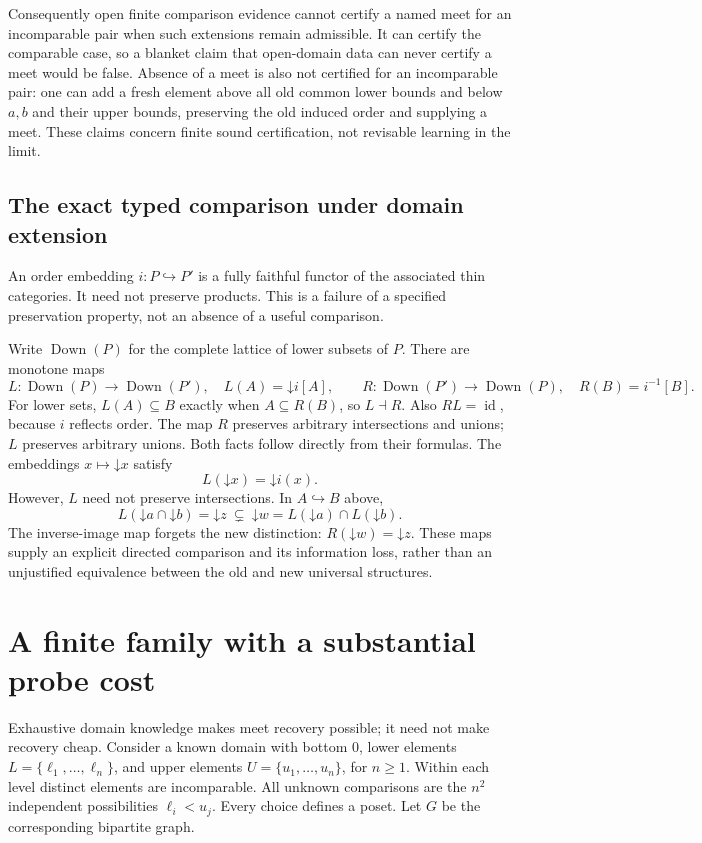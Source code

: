 \documentclass[11pt]{article}
\theoremstyle{remark}
\newcommand{\id}{\operatorname{id}}
\newcommand{\Down}{\operatorname{Down}}
\begin{document}
Consequently open finite comparison evidence cannot certify a named meet for an incomparable pair when such extensions remain admissible. It can certify the comparable case, so a blanket claim that open-domain data can never certify a meet would be false. Absence of a meet is also not certified for an incomparable pair: one can add a fresh element above all old common lower bounds and below $a,b$ and their upper bounds, preserving the old induced order and supplying a meet. These claims concern finite sound certification, not revisable learning in the limit.

\subsection{The exact typed comparison under domain extension}
\label{sec:downsets}

An order embedding $i:P\hookrightarrow P'$ is a fully faithful functor of the associated thin categories. It need not preserve products. This is a failure of a specified preservation property, not an absence of a useful comparison.

Write $\Down(P)$ for the complete lattice of lower subsets of $P$. There are monotone maps
\[
 L:\Down(P)\longrightarrow\Down(P'),\quad L(A)=\mathord\downarrow i[A],
 \qquad
 R:\Down(P')\longrightarrow\Down(P),\quad R(B)=i^{-1}[B].
\]
For lower sets, $L(A)\subseteq B$ exactly when $A\subseteq R(B)$, so $L\dashv R$. Also $RL=\id$, because $i$ reflects order. The map $R$ preserves arbitrary intersections and unions; $L$ preserves arbitrary unions. Both facts follow directly from their formulas. The embeddings $x\mapsto\mathord\downarrow x$ satisfy
\[
 L(\mathord\downarrow x)=\mathord\downarrow i(x).
\]
However, $L$ need not preserve intersections. In $A\hookrightarrow B$ above,
\[
 L(\mathord\downarrow a\cap\mathord\downarrow b)
 =\mathord\downarrow z
 \ \subsetneq\ 
 \mathord\downarrow w
 =L(\mathord\downarrow a)\cap L(\mathord\downarrow b).
\]
The inverse-image map forgets the new distinction: $R(\mathord\downarrow w)=\mathord\downarrow z$. These maps supply an explicit directed comparison and its information loss, rather than an unjustified equivalence between the old and new universal structures.

\section{A finite family with a substantial probe cost}
\label{sec:c4}

Exhaustive domain knowledge makes meet recovery possible; it need not make recovery cheap. Consider a known domain with bottom $0$, lower elements $L=\{\ell_1,\ldots,\ell_n\}$, and upper elements $U=\{u_1,\ldots,u_n\}$, for $n\ge1$. Within each level distinct elements are incomparable. All unknown comparisons are the $n^2$ independent possibilities $\ell_i<u_j$. Every choice defines a poset. Let $G$ be the corresponding bipartite graph.
\end{document}
